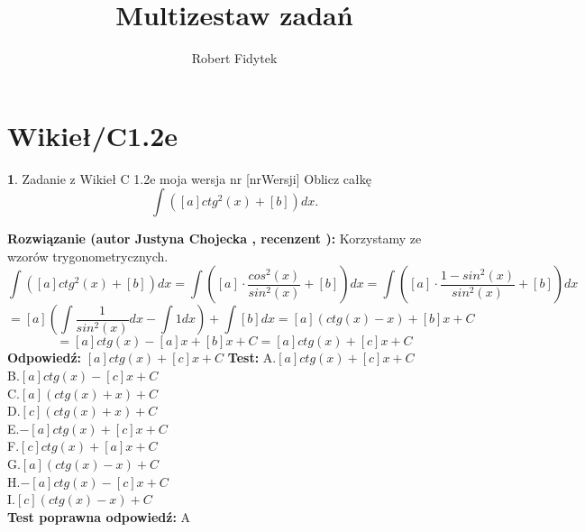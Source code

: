 \documentclass[12pt, a4paper]{article}
\title{Multizestaw zadań}
\author{Robert Fidytek}
\date{}
\theoremstyle{definition} %
\newtheorem{zad}{}
\newcommand{\kategoria}[1]{\section{#1}} %
\newcommand{\zadStart}[1]{\begin{zad}#1\newline} %
\newcommand{\zadStop}{\end{zad}}   %
\newcommand{\rozwStart}[2]{\noindent \textbf{Rozwiązanie (autor #1 , recenzent #2): }\newline} %
\newcommand{\rozwStop}{\newline}                                            %
\newcommand{\odpStart}{\noindent \textbf{Odpowiedź:}\newline}    %
\newcommand{\odpStop}{\newline}                                             %
\newcommand{\testStart}{\noindent \textbf{Test:}\newline} %
\newcommand{\testStop}{\newline} %
\newcommand{\kluczStart}{\noindent \textbf{Test poprawna odpowiedź:}\newline} %
\newcommand{\kluczStop}{\newline} %
\begin{document}
\maketitle
\kategoria{Wikieł/C1.2e}
\zadStart{Zadanie z Wikieł C 1.2e moja wersja nr [nrWersji]}
Oblicz całkę $$\int ([a]ctg^{2}(x)+[b]) dx.$$
\zadStop
\rozwStart{Justyna Chojecka}{}
Korzystamy ze wzorów trygonometrycznych.
$$\int ([a]ctg^{2}(x)+[b]) dx=\int \left([a]\cdot\frac{cos^{2}(x)}{sin^{2}(x)}+[b]\right)dx=\int \left([a]\cdot\frac{1-sin^{2}(x)}{sin^{2}(x)}+[b]\right)dx$$$$=[a]\left(\int\frac{1}{sin^{2}(x)}dx-\int 1dx\right)+\int [b]dx=[a]\left(ctg(x)-x\right)+[b]x+C$$$$=[a]ctg(x)-[a]x+[b]x+C=[a]ctg(x)+[c]x+C$$
\rozwStop
\odpStart
$[a]ctg(x)+[c]x+C$
\odpStop
\testStart
A.$[a]ctg(x)+[c]x+C$\\
B.$[a]ctg(x)-[c]x+C$\\
C.$[a](ctg(x)+x)+C$\\
D.$[c](ctg(x)+x)+C$\\
E.$-[a]ctg(x)+[c]x+C$\\
F.$[c]ctg(x)+[a]x+C$\\
G.$[a](ctg(x)-x)+C$\\
H.$-[a]ctg(x)-[c]x+C$\\
I.$[c](ctg(x)-x)+C$\\
\testStop
\kluczStart
A
\kluczStop
\end{document}
